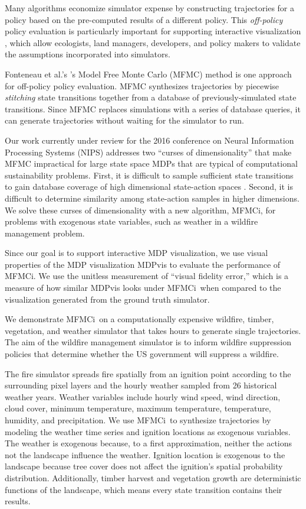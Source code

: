 \documentclass{article}
\newcommand{\visname}{{\sc MDPv\/is}}
\newcommand{\algname}{MFMCi}
\begin{document}
Many algorithms economize simulator expense by constructing
trajectories for a policy based on the pre-computed results of a different policy.
This \emph{off-policy} policy evaluation is particularly important
for supporting interactive visualization \cite{McGregor2015a}, which
allow ecologists, land managers, developers, and policy makers
to validate the assumptions incorporated into simulators.

Fonteneau et al.'s \cite{Fonteneau2010c}'s Model Free Monte Carlo (MFMC) method
is one approach for off-policy policy evaluation.
MFMC synthesizes trajectories by piecewise \emph{stitching} state transitions
together from a database of
previously-simulated state transitions.
Since MFMC replaces simulations with a series of database queries, it
can generate trajectories without waiting for
the simulator to run.

Our work currently under review for the 2016 conference on Neural Information Processing Systems (NIPS)
addresses two ``curses of dimensionality'' that make MFMC impractical for
large state space MDPs that are typical of computational sustainability problems.
First, it is difficult to sample sufficient state transitions to gain database coverage
of high dimensional state-action spaces \cite{Hallak2015}. Second, it is difficult
to determine similarity among state-action samples in higher dimensions.
We solve these curses of dimensionality with a new algorithm, \algname,
for problems with exogenous state variables,
such as weather in a wildfire management problem.

Since our goal is to support interactive MDP visualization, we use visual properties
of the MDP visualization \visname{} \cite{McGregor2015a} to evaluate the performance of \algname.
We use the unitless measurement of ``visual fidelity error,'' which is a measure of
how similar \visname{} looks under \algname\ when compared to the visualization generated
from the ground truth simulator.

We demonstrate \algname\ on a computationally expensive wildfire, timber,
vegetation, and weather simulator that takes hours to generate single
trajectories. The aim of the wildfire management simulator is to inform
wildfire suppression policies that determine whether the US government
will suppress a wildfire.

The fire simulator spreads fire spatially from an ignition point
according to the surrounding pixel layers and the hourly weather
sampled from 26 historical weather years.
Weather variables include hourly wind speed,
wind direction, cloud cover, minimum temperature, maximum temperature,
temperature, humidity, and precipitation.
We use \algname\ to synthesize trajectories
by modeling the weather time series and ignition locations as exogenous variables.
The weather is exogenous because, to a first approximation,
neither the actions not the landscape influence the weather.
Ignition location is exogenous to the landscape because tree cover does not affect
the ignition's spatial probability
distribution. Additionally, timber harvest and vegetation growth are deterministic
functions of the landscape, which means every state transition contains their results.
\end{document}
